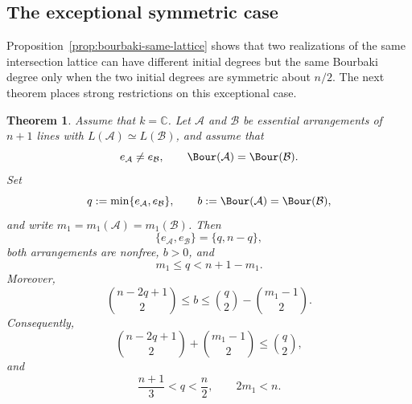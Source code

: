 \documentclass[11pt]{amsart}   %
\newtheorem{Theorem}{Theorem}[section]
\theoremstyle{definition}
\def\NZQ{\mathbb}               %
\def\CC{{\NZQ C}}
\def\A{{\mathcal A}}
\def\B{{\mathcal B}}
\begin{document}
\subsection{The exceptional symmetric case}
\label{subsec:exceptional-symmetric-case}

Proposition~\ref{prop:bourbaki-same-lattice} shows that two realizations of the same intersection lattice can have different initial degrees but the same Bourbaki degree only when the two initial degrees are symmetric about $n/2$. The next theorem places strong restrictions on this exceptional case.

\begin{Theorem}
\label{thm:symmetric-bourbaki-obstruction}
Assume that $k=\CC$. Let $\A$ and $\B$ be essential arrangements of $n+1$ lines with $L(\A)\simeq L(\B)$, and assume that
\[
e_\A\neq e_\B,
\qquad
\Bour(\A)=\Bour(\B).
\]
Set
\[
q:=\min\{e_\A,e_\B\}, \qquad b:=\Bour(\A)=\Bour(\B),
\]
and write $m_1=m_1(\A)=m_1(\B)$. Then
\[
\{e_\A,e_\B\}=\{q,n-q\},
\]
both arrangements are nonfree, $b>0$, and
\[
m_1\leq q<n+1-m_1.
\]
Moreover,
\begin{equation}
\label{eq:symmetric-bourbaki-bounds}
\binom{n-2q+1}{2}
\leq b \leq
\binom q2-\binom{m_1-1}{2}.
\end{equation}
Consequently,
\begin{equation}
\label{eq:symmetric-bourbaki-obstruction}
\binom{n-2q+1}{2}
+
\binom{m_1-1}{2}
\leq
\binom q2,
\end{equation}
and
\[
\frac{n+1}{3}<q<\frac n2,
\qquad 2m_1<n.
\]
\end{Theorem}
\end{document}
